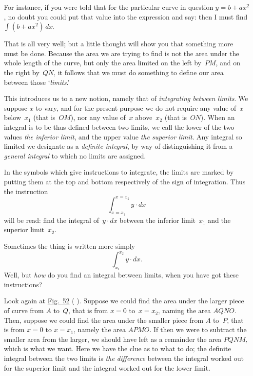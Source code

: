 \documentclass[12pt]{book}[2005/09/16]
\newcommand{\ds}{\displaystyle}
\newcommand{\DPPageSep}[2]{\Pagelabel{#2}}
\newcommand{\Pagelabel}[1]
  {\phantomsection\label{#1}}
\newcommand{\Pageref}[2][p.]{%
  \ifthenelse{\not\equal{#1}{}}{%
    \hyperref[#2]{#1~\pageref{#2}}%
  }{%
    \hyperref[#2]{\pageref{#2}}%
  }%
}
\newcommand{\Fig}[1]{\hyperref[fig:#1]{Fig.~#1}}
\begin{document}
For instance, if you were told that for the particular
curve in question $y = b + ax^2$, no doubt you could put
that value into the expression and say: then I must
find $\ds\int (b + ax^2)\, dx$. %

That is all very well; but a little thought will show
you that something more must be done. Because the
area we are trying to find is not the area under the
whole length of the curve, but only the area limited
on the left by~$PM$, and on the right by~$QN$, it follows
that we must do something to define our area between
those `\emph{limits}.'\Pagelabel{limits} %

This introduces us to a new notion, namely that of
\emph{integrating between limits}. We suppose $x$ to vary,
and for the present purpose we do not require any
value of~$x$ below~$x_1$ (that is~$OM$), nor any value of~$x$
above~$x_2$ (that is~$ON$). When an integral is to be
thus defined between two limits, we call the lower
of the two values \emph{the inferior limit}, and the upper
value \emph{the superior limit}. Any integral so limited
we designate as a \emph{definite integral}, by way of distinguishing
it from a \emph{general integral} to which no
limits are assigned.

In the symbols which give instructions to integrate,
the limits are marked by putting them at the top
and bottom respectively of the sign of integration.
Thus the instruction
\[
\int_{x=x_1}^{x=x_2} y · dx
\]
\DPPageSep{221.png}{209}%
will be read: find the integral of~$y · dx$ between the
inferior limit~$x_1$ and the superior limit~$x_2$.

Sometimes the thing is written more simply
\[
\int^{x_2}_{x_1} y · dx.
\]
Well, but \emph{how} do you find an integral between limits,
when you have got these instructions?

Look again at \Fig{52} (\Pageref{fig:52}). Suppose we could %
find the area under the larger piece of curve from
$A$ to~$Q$, that is from $x = 0$ to~$x = x_2$, naming the area
$AQNO$. Then, suppose we could find the area under
the smaller piece from $A$ to~$P$, that is from $x = 0$ to
$x = x_1$, namely the area $APMO$. If then we were to
subtract the smaller area from the larger, we should
have left as a remainder the area $PQNM$, which is
what we want. Here we have the clue as to what
to do; the definite integral between the two limits is
\emph{the difference} between the integral worked out for
the superior limit and the integral worked out for the
lower limit.
\end{document}
